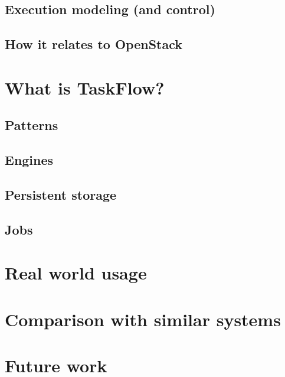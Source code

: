 \documentclass[11pt,a4paper]{article}
\begin{document}
\subsection{Execution modeling (and control)}

\subsection{How it relates to OpenStack}

\section{What is TaskFlow?}

\subsection{Patterns}

\subsection{Engines}

\subsection{Persistent storage}

\subsection{Jobs}

\section{Real world usage}

\section{Comparison with similar systems}

\section{Future work}
\end{document}
